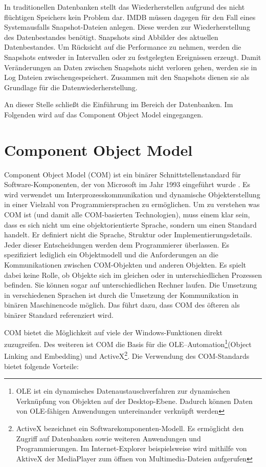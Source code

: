 In traditionellen Datenbanken stellt das Wiederherstellen aufgrund des nicht flüchtigen Speichers kein Problem dar. IMDB müssen dagegen für den Fall eines Systemausfalls Snapshot-Dateien anlegen. Diese werden zur Wiederherstellung des Datenbestandes benötigt. Snapshots sind Abbilder des aktuellen Datenbestandes. Um Rücksicht auf die Performance zu nehmen, werden die Snapshots entweder in Intervallen oder zu festgelegten Ereignissen erzeugt. Damit Veränderungen an Daten zwischen Snapshots nicht verloren gehen, werden sie in Log Dateien zwischengespeichert. Zusammen mit den Snapshots dienen sie als Grundlage für die Datenwiederherstellung. 

An dieser Stelle schließt die Einführung im Bereich der Datenbanken. Im Folgenden wird auf das Component Object Model eingegangen.

\section{Component Object Model}
\label{ch:grundlagen:sec:ComponentObjectModel}

Component Object Model (COM) ist ein binärer Schnittstellenstandard für Software-Komponenten, der von Microsoft im Jahr 1993 eingeführt wurde \cite{SWB-088582566}. Es wird verwendet um Interprozesskommunikation und dynamische Objekterstellung in einer Vielzahl von Programmiersprachen zu ermöglichen. Um zu verstehen was COM ist (und damit alle COM-basierten Technologien), muss einem klar sein, dass es sich nicht um eine objektorientierte Sprache, sondern um einen Standard handelt. Er definiert nicht die Sprache, Struktur oder Implementierungsdetails. Jeder dieser Entscheidungen werden dem Programmierer überlassen. Es spezifiziert lediglich ein Objektmodell und die Anforderungen an die Kommunikationen zwischen COM-Objekten und anderen Objekten. Es spielt dabei keine Rolle, ob Objekte sich im gleichen oder in unterschiedlichen Prozessen befinden. Sie können sogar auf unterschiedlichen Rechner laufen. Die Umsetzung in verschiedenen Sprachen ist durch die Umsetzung der Kommunikation in binären Maschinencode möglich. Das führt dazu, dass COM des öfteren als binärer Standard referenziert wird.

COM bietet die Möglichkeit auf viele der Windows-Funktionen direkt zuzugreifen. Des weiteren ist COM die Basis für die OLE–Automation\footnote{OLE ist ein dynamisches Datenaustauschverfahren zur dynamischen Verknüpfung von Objekten auf der Desktop-Ebene. Dadurch können Daten von OLE-fähigen Anwendungen untereinander verknüpft werden}(Object Linking and Embedding) und ActiveX\footnote{ActiveX bezeichnet ein Softwarekomponenten-Modell. Es ermöglicht den Zugriff auf Datenbanken sowie weiteren Anwendungen und Programmierungen. Im Internet-Explorer beispielsweise wird mithilfe von AktiveX der MediaPlayer zum öffnen von Multimedia-Dateien aufgerufen}. Die Verwendung des COM-Standards bietet folgende Vorteile:

